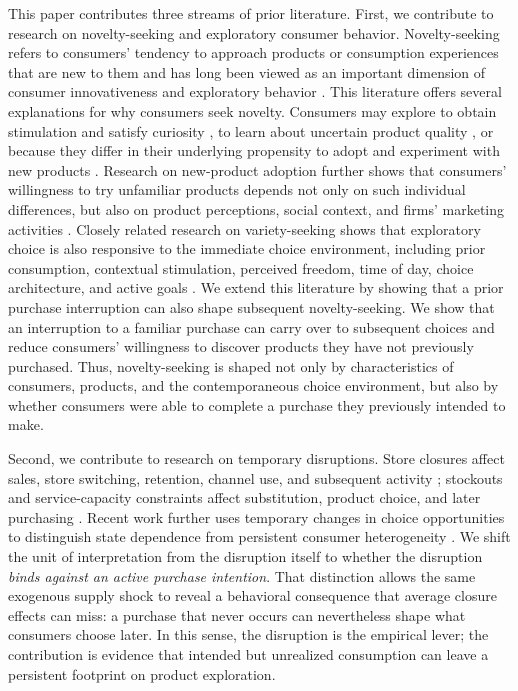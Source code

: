 \documentclass[11 pt]{article}
\begin{document}
This paper contributes three streams of prior literature. First, we contribute to research on novelty-seeking and exploratory consumer behavior. Novelty-seeking refers to consumers' tendency to approach products or consumption experiences that are new to them and has long been viewed as an important dimension of consumer innovativeness and exploratory behavior \citep{hirschman1980innovativeness,raju1980optimum,steenkamp1992role}. This literature offers several explanations for why consumers seek novelty. Consumers may explore to obtain stimulation and satisfy curiosity \citep{raju1980optimum,steenkamp1992role}, to learn about uncertain product quality \citep{erdem1996uncertainty}, or because they differ in their underlying propensity to adopt and experiment with new products \citep{hirschman1980innovativeness,steenkamp2003trial}. Research on new-product adoption further shows that consumers' willingness to try unfamiliar products depends not only on such individual differences, but also on product perceptions, social context, and firms' marketing activities \citep{ostlund1974perceived,fisher1992investigation,steenkamp2003trial}. Closely related research on variety-seeking shows that exploratory choice is also responsive to the immediate choice environment, including prior consumption, contextual stimulation, perceived freedom, time of day, choice architecture, and active goals \citep{simonson1990variety,menon1995context,levav2009freedom,gullo2019timeofday,odonnell2023bundle,rafieian2024goals}. We extend this literature by showing that a prior purchase interruption can also shape subsequent novelty-seeking. We show that an interruption to a familiar purchase can carry over to subsequent choices and reduce consumers' willingness to discover products they have not previously purchased. Thus, novelty-seeking is shaped not only by characteristics of consumers, products, and the contemporaneous choice environment, but also by whether consumers were able to complete a purchase they previously intended to make.

Second, we contribute to research on temporary disruptions. Store closures affect sales, store switching, retention, channel use, and subsequent activity \citep{haans2010closing,seenivasan2016store,ye2025close}; stockouts and service-capacity constraints affect substitution, product choice, and later purchasing \citep{fitzsimons2000consumer,anderson2006stockouts,jing2011stockouts,che2012outofstock,wangenheim2007overbooking}. Recent work further uses temporary changes in choice opportunities to distinguish state dependence from persistent consumer heterogeneity \citep{levine2023state,Levine2026}. We shift the unit of interpretation from the disruption itself to whether the disruption \textit{binds against an active purchase intention}. That distinction allows the same exogenous supply shock to reveal a behavioral consequence that average closure effects can miss: a purchase that never occurs can nevertheless shape what consumers choose later. In this sense, the disruption is the empirical lever; the contribution is evidence that intended but unrealized consumption can leave a persistent footprint on product exploration.
\end{document}
